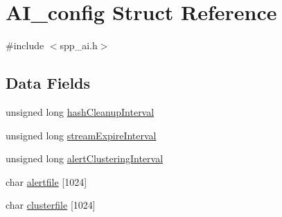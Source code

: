 \hypertarget{structAI__config}{
\section{AI\_\-config Struct Reference}
\label{structAI__config}
}


{\ttfamily \#include $<$spp\_\-ai.h$>$}

\subsection*{Data Fields}
\begin{DoxyCompactItemize}
\item 
unsigned long \hyperlink{structAI__config_a9f7680615027d4fb74b4aa144a7028a4}{hashCleanupInterval}
\item 
unsigned long \hyperlink{structAI__config_abbe77d5f94b8c5164bea47acba09c98b}{streamExpireInterval}
\item 
unsigned long \hyperlink{structAI__config_a7d0d098b8263aa3d8415b11d1ec7f93d}{alertClusteringInterval}
\item 
char \hyperlink{structAI__config_a2efa9590d7eea6dce8b5dd9aa76ed8ca}{alertfile} \mbox{[}1024\mbox{]}
\item 
char \hyperlink{structAI__config_a6da02a3f7116fd3810a41b738e8883a3}{clusterfile} \mbox{[}1024\mbox{]}
\end{DoxyCompactItemize}


